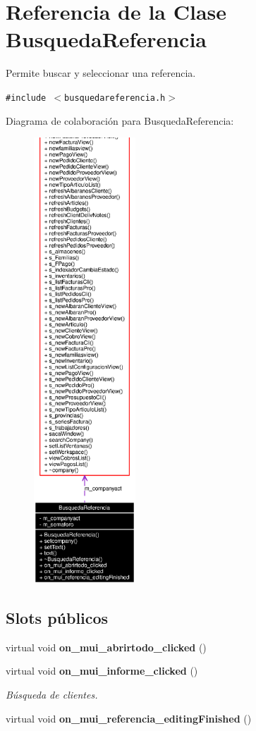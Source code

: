 \section{Referencia de la Clase Busqueda\-Referencia}
\label{classBusquedaReferencia}
Permite buscar y seleccionar una referencia.  


{\tt \#include $<$busquedareferencia.h$>$}

Diagrama de colaboraci\'{o}n para Busqueda\-Referencia:\begin{figure}[H]
\begin{center}
\leavevmode
\includegraphics[width=108pt]{classBusquedaReferencia__coll__graph}
\end{center}
\end{figure}
\subsection*{Slots p\'{u}blicos}
\begin{CompactItemize}
\item 
virtual void {\bf on\_\-mui\_\-abrirtodo\_\-clicked} ()
\item 
virtual void {\bf on\_\-mui\_\-informe\_\-clicked} ()\label{classBusquedaReferencia_i1}

\begin{CompactList}\small\item\em B\'{u}squeda de clientes. \item\end{CompactList}\item 
virtual void {\bf on\_\-mui\_\-referencia\_\-editing\-Finished} ()\label{classBusquedaReferencia_i2}

\end{CompactItemize}
